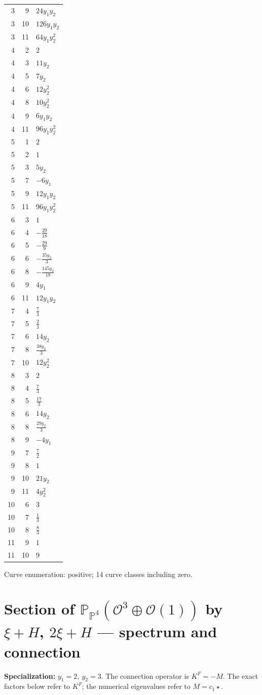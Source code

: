 \documentclass[10pt,a4paper]{article}
\begin{document}
{\begin{longtable}{rrp{125mm}}
3 & 9 & $24 y_{1} y_{2}$\\
3 & 10 & $126 y_{1} y_{2}$\\
3 & 11 & $64 y_{1} y_{2}^{2}$\\
4 & 2 & $2$\\
4 & 3 & $11 y_{2}$\\
4 & 5 & $7 y_{2}$\\
4 & 6 & $12 y_{2}^{2}$\\
4 & 8 & $10 y_{2}^{2}$\\
4 & 9 & $6 y_{1} y_{2}$\\
4 & 11 & $96 y_{1} y_{2}^{2}$\\
5 & 1 & $2$\\
5 & 2 & $1$\\
5 & 3 & $5 y_{2}$\\
5 & 7 & $- 6 y_{1}$\\
5 & 9 & $12 y_{1} y_{2}$\\
5 & 11 & $96 y_{1} y_{2}^{2}$\\
6 & 3 & $1$\\
6 & 4 & $- \frac{29}{18}$\\
6 & 5 & $- \frac{29}{9}$\\
6 & 6 & $- \frac{35 y_{2}}{3}$\\
6 & 8 & $- \frac{145 y_{2}}{18}$\\
6 & 9 & $4 y_{1}$\\
6 & 11 & $12 y_{1} y_{2}$\\
7 & 4 & $\frac{7}{3}$\\
7 & 5 & $\frac{2}{3}$\\
7 & 6 & $14 y_{2}$\\
7 & 8 & $\frac{38 y_{2}}{3}$\\
7 & 10 & $12 y_{2}^{2}$\\
8 & 3 & $2$\\
8 & 4 & $\frac{7}{3}$\\
8 & 5 & $\frac{17}{3}$\\
8 & 6 & $14 y_{2}$\\
8 & 8 & $\frac{29 y_{2}}{3}$\\
8 & 9 & $- 4 y_{1}$\\
9 & 7 & $\frac{7}{2}$\\
9 & 8 & $1$\\
9 & 10 & $21 y_{2}$\\
9 & 11 & $4 y_{2}^{2}$\\
10 & 6 & $3$\\
10 & 7 & $\frac{1}{3}$\\
10 & 8 & $\frac{8}{3}$\\
11 & 9 & $1$\\
11 & 10 & $9$\\
\end{longtable}}
Curve enumeration: positive; 14 curve classes including zero.
\clearpage\section*{Section of $\mathbb P_{\mathbb P^{4}}(\mathcal O^{3}\oplus \mathcal O(1))$ by $\xi +H$, $2\xi +H$ --- spectrum and connection}
\textbf{Specialization:} $y_1=2,\ y_2=3$. The connection operator is $K^F=-M$. The exact factors below refer to $K^F$; the numerical eigenvalues refer to $M=c_1\star$.
\end{document}
